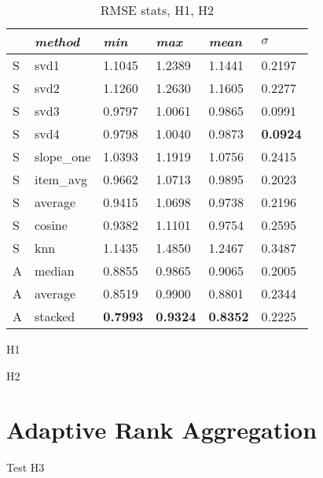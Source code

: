 \begin{table}
  \begin{tabular*}{\textwidth}{ l p{3cm} p{2cm} p{2cm} p{2cm} p{2cm} }
    \toprule
      ~ & \emph{method} & 
      \emph{min} & \emph{max} & \emph{mean} & $\sigma$\\
    \midrule
    S & svd1          & 1.1045	& 1.2389	& 1.1441	& 0.2197 \\
    S & svd2          & 1.1260	& 1.2630	& 1.1605	& 0.2277 \\
    S & svd3          & 0.9797	& 1.0061	& 0.9865	& 0.0991 \\
    S & svd4          & 0.9798	& 1.0040	& 0.9873	& \textbf{0.0924} \\
    S & slope\_one    & 1.0393	& 1.1919	& 1.0756	& 0.2415 \\
    S & item\_avg     & 0.9662	& 1.0713	& 0.9895	& 0.2023 \\
    S & average       & 0.9415	& 1.0698	& 0.9738	& 0.2196 \\
    S & cosine   	    & 0.9382	& 1.1101	& 0.9754	& 0.2595 \\
    S & knn       	  & 1.1435	& 1.4850	& 1.2467	& 0.3487 \\
    \midrule            
    A & median    	  & 0.8855	& 0.9865	& 0.9065	& 0.2005 \\
    A & average    	  & 0.8519	& 0.9900	& 0.8801	& 0.2344 \\
    A & stacked       & \textbf{0.7993}	& \textbf{0.9324}	& \textbf{0.8352}	& 0.2225 \\
    \bottomrule
  \end{tabular*}
  \caption[Results]{RMSE stats, H1, H2}
  \label{table:results:h2:sum}
\end{table}

H1

H2


\section{Adaptive Rank Aggregation}

Test H3




